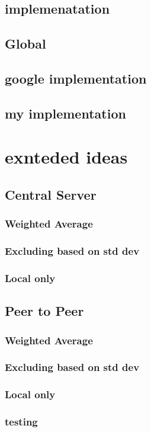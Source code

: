\documentclass[10pt]{article}
\begin{document}
\subsection{implemenatation}
\subsection{Global}
\subsection{google implementation}
\subsection{my implementation}
\clearpage
\section{exnteded ideas}
\subsection{Central Server}

\subsubsection{Weighted Average}
\subsubsection{Excluding based on std dev}
\subsubsection{Local only}
\subsection{Peer to Peer}
\subsubsection{Weighted Average}
\subsubsection{Excluding based on std dev}
\subsubsection{Local only}
\subsubsection{testing}
\end{document}
